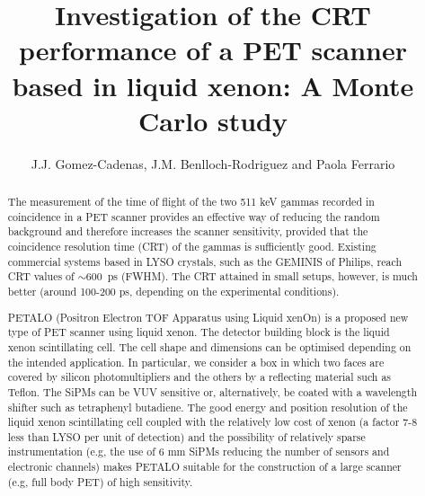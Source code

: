 \documentclass[review]{elsarticle}
\begin{document}
\begin{frontmatter}

\title{Investigation of the CRT performance of a PET scanner based in liquid xenon: A Monte Carlo study}


\author{J.J. Gomez-Cadenas, J.M. Benlloch-Rodriguez and Paola Ferrario}
\address{IFIC (U. Valencia/CSIC)}

%
%

\begin{abstract}
The measurement of the time of flight of the two 511 keV gammas recorded in coincidence in a PET scanner provides an effective way of reducing the random background and therefore increases the scanner sensitivity, provided that the coincidence resolution time (CRT) of the gammas is sufficiently good. Existing commercial systems based in LYSO crystals, such as the GEMINIS of Philips, reach CRT values of 
$\sim 600$~ps (FWHM). The CRT attained in small setups, however, is much better (around 100-200 ps, depending on the experimental conditions). 

PETALO (Positron Electron TOF Apparatus using Liquid xenOn) is a proposed new type of PET scanner using liquid xenon. The detector building block is the liquid xenon scintillating cell. The cell shape and dimensions can be optimised depending on the intended application. In particular, we consider a box in which two faces are covered by silicon photomultipliers and the others by a reflecting material such as Teflon. The SiPMs can be VUV sensitive or, alternatively, be coated with a wavelength shifter such as tetraphenyl butadiene. The good energy and position resolution of the liquid xenon scintillating cell coupled with the relatively low cost of xenon (a factor 7-8 less than LYSO per unit of detection) and the possibility of relatively sparse instrumentation (e.g, the use of 6 mm SiPMs reducing the number of sensors and electronic channels) makes PETALO suitable for the construction of a large scanner (e.g, full body PET) of high sensitivity.   


\end{abstract}
\end{frontmatter}
\end{document}
